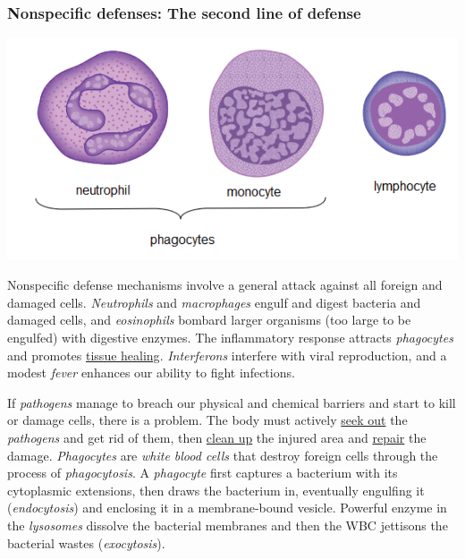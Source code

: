 \documentclass[11pt]{article}
\begin{document}
\subsubsection{Nonspecific defenses: The second line of defense}
\label{sec:org6b2fd64}
\begin{center}
\includegraphics[width=.9\linewidth]{Ch. 9/immune_2016-11-16_23-18-44.png}
\end{center}
Nonspecific defense mechanisms involve a general attack against all foreign and
damaged cells. \emph{Neutrophils} and \emph{macrophages} engulf and digest bacteria and
damaged cells, and \emph{eosinophils} bombard larger organisms (too large to be
engulfed) with digestive enzymes. The inflammatory response attracts \emph{phagocytes}
and promotes \uline{tissue healing}. \emph{Interferons} interfere with viral reproduction, and
a modest \emph{fever} enhances our ability to fight infections.

If \emph{pathogens} manage to breach our physical and chemical barriers and start to
kill or damage cells, there is a problem. The body must actively \uline{seek out} the
\emph{pathogens} and get rid of them, then \uline{clean up} the injured area and \uline{repair} the
damage. \emph{Phagocytes} are \emph{white blood cells} that destroy foreign cells through the
process of \emph{phagocytosis}. A \emph{phagocyte} first captures a bacterium with its
cytoplasmic extensions, then draws the bacterium in, eventually engulfing it
(\emph{endocytosis}) and enclosing it in a membrane-bound vesicle. Powerful enzyme in
the \emph{lysosomes} dissolve the bacterial membranes and then the WBC jettisons the
bacterial wastes (\emph{exocytosis}).
\end{document}
